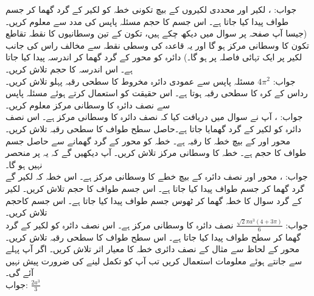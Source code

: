 جواب:\quad
{}، 
لکیر  اور محددی لکیروں کے بیچ تکونی خطہ کو لکیر  کے گرد گھما کر جسم طواف پیدا کیا جاتا ہے۔ اس جسم کا حجم مسئلہ پاپس کی مدد سے معلوم کریں۔ (جیسا آپ صفحہ  پر سوال  میں دیکھ چکے ہیں، تکون کے تین وسطانیوں کا نقطہ تقاطع تکون کا وسطانی مرکز ہو گا اور یہ قاعدہ کی وسطی نقطہ  سے مخالف راس کی جانب لکیر پر  ایک تہائی فاصلہ پر ہو گا۔)
دائرہ  کو محور  کے گرد گھما کر اندرسہ پیدا کیا جاتا ہے۔ اس اندرسہ کا حجم تلاش کریں۔\\
جواب:\quad
$4\pi^2$
مسئلہ پاپس  سے عمودی دائرہ مخروط کا سطحی رقبہ پہلو تلاش کریں۔
رداس  کے کرہ کا سطحی رقبہ  ہوتا ہے۔ اس حقیقت کو استعمال کرتے ہوئے مسئلہ پاپس سے نصف دائرہ  کا وسطانی مرکز معلوم کریں۔\\
جواب:\quad
{}،  
آپ نے سوال  میں دریافت کیا کہ نصف دائرہ  کا وسطانی مرکز  ہے۔ اس نصف دائرہ کو لکیر  کے گرد گھمایا جاتا ہے۔حاصل سطح طواف کا سطحی رقبہ تلاش کریں۔
محور  اور  کے بیچ خطہ  کا رقبہ  ہے۔ خطہ  کو محور  کے گرد گھمانے سے حاصل جسم طواف کا حجم  ہے۔ خطہ  کا وسطانی مرکز تلاش کریں۔ آپ دیکھیں گے کہ یہ  پر منحصر نہیں ہو گا۔\\
جواب:\quad
{}، 
محور  اور نصف دائرہ  کے بیچ خطے کا وسطانی مرکز  ہے۔ اس خطہ کہ لکیر  گے گرد گھما کر جسم طواف پیدا کیا جاتا ہے۔ اس جسم طواف کا حجم تلاش کریں۔
لکیر  کے گرد سوال  کا خطہ گھما کر ٹھوس جسم طواف پیدا کیا جاتا ہے۔ اس جسم کاحجم تلاش کریں۔\\
جواب:\quad
$\tfrac{\sqrt{2}\pi a^3(4+3\pi)}{6}$
نصف دائرہ  کا وسطانی مرکز  ہے۔ اس نصف دائرہ کو لکیر  کے گرد گھما کر سطح طواف پیدا کیا جاتا ہے۔ اس سطح طواف کا سطحی رقبہ تلاش کریں۔
محور  کے لحاظ سے مثال  کے نصف دائری خطہ کا معیار اثر تلاش کریں۔ اگر آپ پہلے سے جانتے ہوئے معلومات استعمال کریں تب آپ کو تکمل لینے کی ضرورت پیش نہیں آئے گی۔\\
جواب:\quad
$\tfrac{2a^3}{3}$
